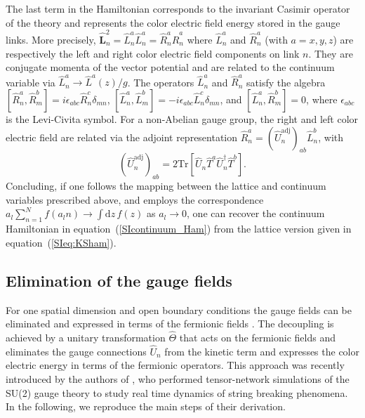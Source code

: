 \documentclass[twocolumn,aps,showpacs,prb,superscriptaddress,floatfix,10pt,nofootinbib]{revtex4-2}
\begin{document}
The last term in the Hamiltonian corresponds to the invariant Casimir operator of the theory and represents the color electric field energy stored in the gauge links. More precisely,  $\hat{\boldsymbol{L}}_{n}^{2}=\hat{L}_{n}^{a}\hat{L}_{n}^{a}=\hat{R}_{n}^{a}\hat{R}_{n}^{a}$ where $\hat{L}_{n}^{a}$  and $\hat{R}_{n}^{a}$ (with $a=x,y,z$) are respectively the left and right color electric field components on link $n$. They are conjugate momenta of the vector potential \cite{kogut_introduction_1979} and are related to the continuum variable via $\hat{L}_{n}^{a}\rightarrow \hat{L}^{a}(z)/g$. The operators $\hat{L}_{n}^{a}$ and $\hat{R}_{n}^{a}$ satisfy the algebra $[\hat{R}_{n}^{a},\hat{R}_{m}^{b}]=i\epsilon_{abc}\hat{R}_{n}^{c}\delta_{mn}$,  $[\hat{L}_{n}^{a},\hat{L}_{m}^{b}]=-i\epsilon_{abc}\hat{L}_{n}^{c}\delta_{mn}$, and $[\hat{L}_{n}^{a},\hat{R}_{m}^{b}]=0$, where $\epsilon_{abc}$ is the Levi-Civita symbol.
For a non-Abelian gauge group, the right and left color electric field are related via the adjoint representation $\hat{R}_{n}^{a}=(\hat{U}_n^\text{adj})_{ab}\hat{L}_{n}^{b}$, with 
\begin{equation}
(\hat{U}_{n}^\text{adj})_{ab}=2\mathrm{Tr}\left[ \hat{U}_{n}\hat{T}^{a}\hat{U}_{n}^{\dagger}\hat{T}^{b}\right].
\label{adjoint_def}
\end{equation}
Concluding, if one follows the mapping between the lattice and continuum variables prescribed above, and employs the correspondence
$a_l \sum_{n=1}^{N}f(a_l n)\rightarrow \int \mathrm{d}z\, f(z)$ as $a_l \rightarrow 0$, one can recover the continuum Hamiltonian in equation~(\ref{SIcontinuum_Ham}) from the lattice version given in equation~(\ref{SIeq:KSham}). 


\subsection{Elimination of the gauge fields}
\label{SI:elimination}
For one spatial dimension and open boundary conditions the gauge fields can be eliminated and expressed in terms of the fermionic fields \cite{hamer_lattice_1977,sala_variational_2018}. The decoupling is achieved by a unitary transformation $\hat{{\Theta}}$ that acts on the fermionic fields and eliminates the gauge connections $\hat{U}_n$ from the kinetic term and expresses the color electric energy in terms of the fermionic operators. This approach was recently introduced by the authors of \cite{sala_variational_2018}, who performed tensor-network simulations of the SU(2) gauge theory to study real time dynamics of string breaking phenomena.
In the following, we reproduce the main steps of their derivation.
\end{document}
